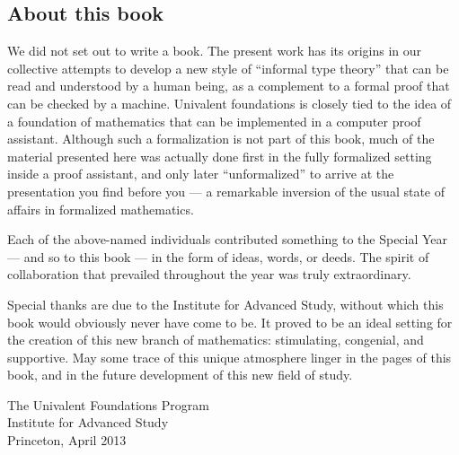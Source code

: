 \documentclass[12pt]{article}
\newcommand{\mentalpause}{\medskip}
\begin{document}
\subsection*{About this book}

We did not set out to write a book. The present work has its origins in our collective attempts to develop a new style of ``informal type theory'' that can be read and understood by a human being, as a complement to a formal proof that can be checked by a machine.
Univalent foundations is closely tied to the idea of a foundation of mathematics that can be implemented in a computer proof assistant. Although such a formalization is not part of this book, much of the material presented here was actually done first in the fully formalized setting inside a proof assistant, and only later ``unformalized'' to arrive at the presentation you find before you --- a remarkable inversion of the usual state of affairs in formalized mathematics.

Each of the above-named individuals contributed something to the Special Year --- and so to this book --- in the form of ideas, words, or deeds. The spirit of collaboration that prevailed throughout the year was truly extraordinary.

\mentalpause

Special thanks are due to the Institute for Advanced Study, without which this book would obviously never have come to be. It proved to be an ideal setting for the creation of this new branch of mathematics: stimulating, congenial, and supportive. May some trace of this unique atmosphere linger in the pages of this book, and in the future development of this new field of study.

\bigskip

\begin{flushright}
The Univalent Foundations Program\\
Institute for Advanced Study\\
Princeton, April 2013
\end{flushright}
\end{document}
